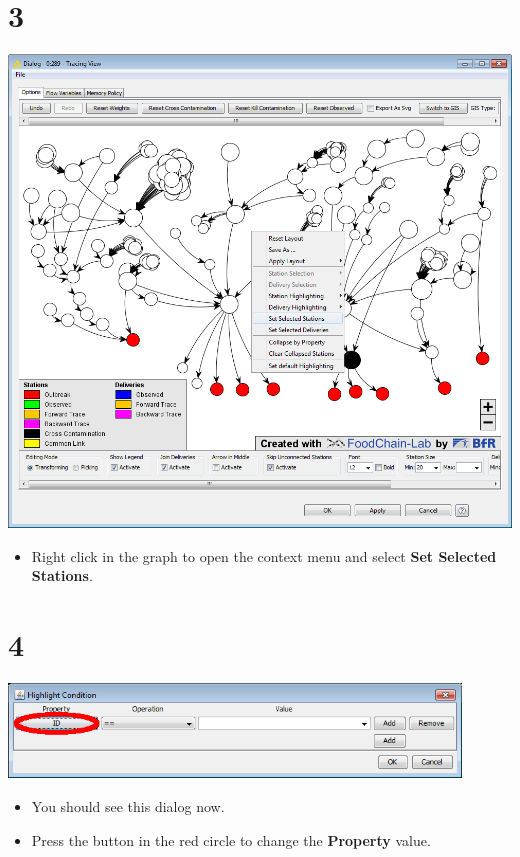 \documentclass{beamer}
\begin{document}
\section{3}
\begin{frame}
	\begin{center}
  		\includegraphics[height=0.6\textheight]{3.png}
	\end{center}
	\begin{itemize}
		\item Right click in the graph to open the context menu and select \textbf{Set Selected Stations}.
	\end{itemize}
\end{frame}

\section{4}
\begin{frame}
	\begin{center}
  		\includegraphics[width=0.9\textwidth]{4.png}
	\end{center}
	\begin{itemize}
		\item You should see this dialog now.
		\item Press the button in the red circle to change the \textbf{Property} value.
	\end{itemize}
\end{frame}
\end{document}
